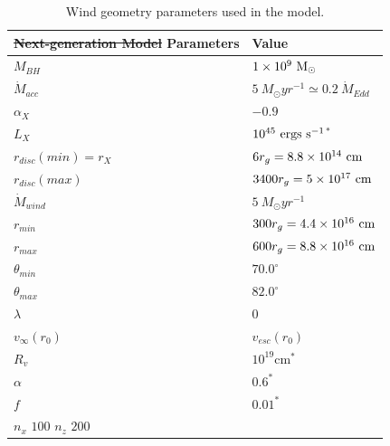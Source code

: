 \documentclass[preprint, a4paper, 11pt]{aastex}
\providecommand{\DIFadd}[1]{{\protect\color{blue}\uwave{#1}}} %
\providecommand{\DIFdel}[1]{{\protect\color{red}\sout{#1}}}                      %
\providecommand{\DIFaddFL}[1]{\DIFadd{#1}} %
\providecommand{\DIFdelFL}[1]{\DIFdel{#1}} %
\providecommand{\DIFaddbeginFL}{} %
\providecommand{\DIFaddendFL}{} %
\providecommand{\DIFdelbeginFL}{} %
\providecommand{\DIFdelendFL}{} %
\begin{document}
\begin{table}
\begin{tabular}{p{3cm}p{4cm}}
\hline \DIFdelbeginFL \DIFdelFL{Next-generation Model }\DIFdelendFL \DIFaddbeginFL \DIFaddFL{Free }\DIFaddendFL Parameters 	&	 Value \\ 
\hline \hline 
$M_{BH}$ 	 &	 $1\times 10^9~\rm{M_{\odot}}$ \\ 
$\dot{M}_{acc}$ 	 &	 $5~M_{\odot}yr^{-1} \simeq 0.2~\dot{M}_{Edd}$\\ 
$\alpha_X$ 	 &	 $-0.9$ \\ 
$L_{X} $ 	 &	 $10^{45}~\rm{ergs~s^{-1}}$$^*$ \\ 
$r_{disc}(min)=r_{X}$   &	 $6r_g=8.8\times10^{14}~{\rm cm}$ \\ 
$r_{disc}(max)$   &	 $3400r_g = 5\times10^{17}~{\rm cm}$ \\ 
$\dot{M}_{wind}$  &	 $5~M_{\odot}yr^{-1}$ \\ 
$r_{min}$ 	&	 $300r_{g} = 4.4\times10^{16}~{\rm cm}$\\ 
$r_{max}$ 	&	 $600r_{g} = 8.8\times10^{16}~{\rm cm}$ \\ 
$\theta_{min}$ 	&	 $70.0^{\circ}$ \\ 
$\theta_{max}$ 	&	 $82.0^{\circ}$ \\ 
$\lambda$ 	&	 $0$ \\ 
$v_{\infty}(r_0)$ 	&	 $v_{esc}(r_0)$ \\ 
$R_v$  	        &	 $10^{19}$cm$^*$ \\ 
$\alpha$ 	&	 $0.6^*$ \\
$f$ 	&	 $0.01^*$  \\
\DIFdelbeginFL \DIFdelFL{$n_x$ 	}%
\DIFdelFL{$100$  }%
\DIFdelFL{$n_z$ 	}%
\DIFdelFL{$200$  }%
\DIFdelendFL \hline 
\end{tabular}
\caption{Wind geometry parameters used in the model.}
\label{wind_param}
\end{table}
\end{document}

